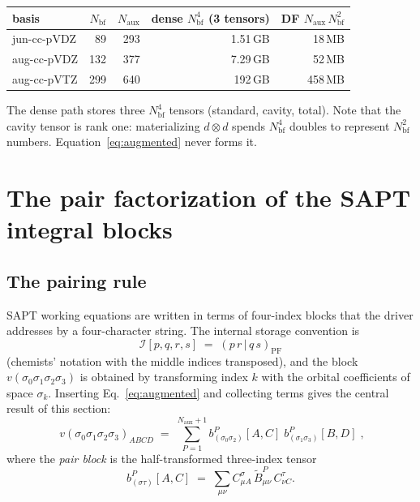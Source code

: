 \documentclass[11pt]{article}
\newcommand{\naux}{N_{\mathrm{aux}}}
\newcommand{\nbf}{N_{\mathrm{bf}}}
\begin{document}
\begin{center}
\small
\begin{tabular}{lrrrr}
\toprule
basis & $\nbf$ & $\naux$ & dense $\nbf^4$ (3 tensors) & DF $\naux\,\nbf^2$ \\
\midrule
jun-cc-pVDZ & 89 & 293 & 1.51\,GB & 18\,MB \\
aug-cc-pVDZ & 132 & 377 & 7.29\,GB & 52\,MB \\
aug-cc-pVTZ & 299 & 640 & 192\,GB & 458\,MB \\
\bottomrule
\end{tabular}
\end{center}

\noindent
The dense path stores three $\nbf^4$ tensors (standard, cavity, total). Note
that the cavity tensor is rank one: materializing $d\otimes d$ spends $\nbf^4$
doubles to represent $\nbf^2$ numbers. Equation~\eqref{eq:augmented} never
forms it.

\section{The pair factorization of the SAPT integral blocks}
\label{sec:pairs}

\subsection{The pairing rule}

SAPT working equations are written in terms of four-index blocks that the
driver addresses by a four-character string. The internal storage convention is
\begin{equation}
\mathcal{I}[p,q,r,s] \;=\; (p\,r\,|\,q\,s)_{\mathrm{PF}}
\end{equation}
(chemists' notation with the middle indices transposed), and the block
$v(\sigma_0\sigma_1\sigma_2\sigma_3)$ is obtained by transforming index $k$ with
the orbital coefficients of space $\sigma_k$. Inserting
Eq.~\eqref{eq:augmented} and collecting terms gives the central result of this
section:
\begin{equation}
\boxed{\;
v(\sigma_0\sigma_1\sigma_2\sigma_3)_{ABCD}
\;=\; \sum_{P=1}^{\naux+1}
b^{P}_{(\sigma_0\sigma_2)}[A,C]\;
b^{P}_{(\sigma_1\sigma_3)}[B,D] \;} ,
\label{eq:pairfac}
\end{equation}
where the \emph{pair block} is the half-transformed three-index tensor
\begin{equation}
b^{P}_{(\sigma\tau)}[A,C] \;=\; \sum_{\mu\nu} C^{\sigma}_{\mu A}\,
\tilde{B}^{P}_{\mu\nu}\, C^{\tau}_{\nu C} .
\label{eq:pairblock}
\end{equation}
\end{document}
